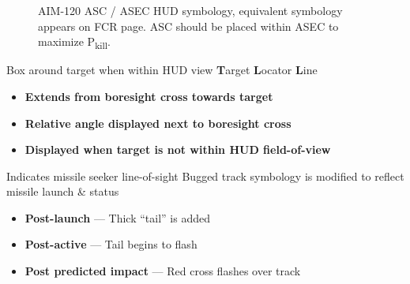 \begin{figure}[htbp]
    \centering
    \caption{
        AIM-120 ASC / ASEC HUD symbology, equivalent symbology appears on FCR page. 
        ASC should be placed within ASEC to maximize P\textsubscript{kill}.
    }
    \label{fig:aa_weap:aim120:asc_asec}
\end{figure}

\begin{tcoloritemize}
     Box around target when within HUD view
    \blueitem[TLL]
    \textbf{T}arget \textbf{L}ocator \textbf{L}ine
    
    \begin{itemize}
        \item \textbf{Extends from boresight cross towards target}
        \item \textbf{Relative angle displayed next to boresight cross}
        \item \textbf{Displayed when target is not within HUD field-of-view}
    \end{itemize}
     Indicates missile seeker line-of-sight
    Bugged track symbology is modified to reflect missile launch \& status

    \begin{itemize}
        \item \textbf{Post-launch} --- Thick ``tail'' is added
        \item \textbf{Post-active} --- Tail begins to flash
        \item \textbf{Post predicted impact} --- Red cross flashes over track
    \end{itemize}
\end{tcoloritemize}

